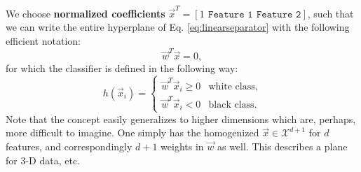 \documentclass{article}
\begin{document}
{\flushleft We} choose \textbf{normalized coefficients} $\vec{x}^T=[ 1\ \, \texttt{Feature 1}\ \,\texttt{Feature 2}]$, such that we can write the entire hyperplane of Eq. \eqref{eq:linearseparator} with the following efficient notation:
\begin{equation}
    \vec{w}^T\vec{x} = 0,
\end{equation}
for which the classifier is defined in the following way:
\begin{equation}
    h(\vec{x}_i) = \begin{cases} \vec{w}^T\vec{x}_i\geq 0 & \text{white class},\\ \vec{w}^T\vec{x}_i<0 & \text{black class}.\end{cases}
\end{equation}
Note that the concept easily generalizes to higher dimensions which are, perhaps, more difficult to imagine. One simply has the homogenized $\vec{x}\in\mathcal{X}^{d+1}$ for $d$ features, and correspondingly $d+1$ weights in $\vec{w}$ as well. This describes a plane for 3-D data, etc.




\end{document}
